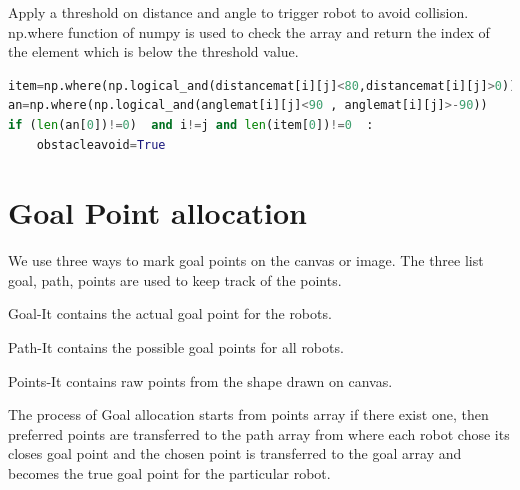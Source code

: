 \documentclass[main.tex]{subfiles}
\begin{document}
Apply a threshold on distance and angle to trigger robot to avoid collision.
np.where function of numpy is used to check the array and return the index of the element which is below the threshold value.

\begin{lstlisting}[language=Python, caption = Searching matrix ]
item=np.where(np.logical_and(distancemat[i][j]<80,distancemat[i][j]>0)) 
an=np.where(np.logical_and(anglemat[i][j]<90 , anglemat[i][j]>-90))
if (len(an[0])!=0)  and i!=j and len(item[0])!=0  : 
	obstacleavoid=True
\end{lstlisting}
\pagebreak	
\section{Goal Point allocation}
We use three ways to mark goal points on the canvas or image.
The three list goal, path, points are used to keep track of the points.

Goal-It contains the actual goal point for the robots.

Path-It contains the possible goal points for all robots.

Points-It contains raw points from the shape drawn on canvas.

The process of Goal allocation starts from points array if there exist one, then preferred points are transferred to the path array from where each robot chose its closes goal point and the chosen point is transferred to the goal array and becomes the true goal point for the particular robot.
\end{document}
